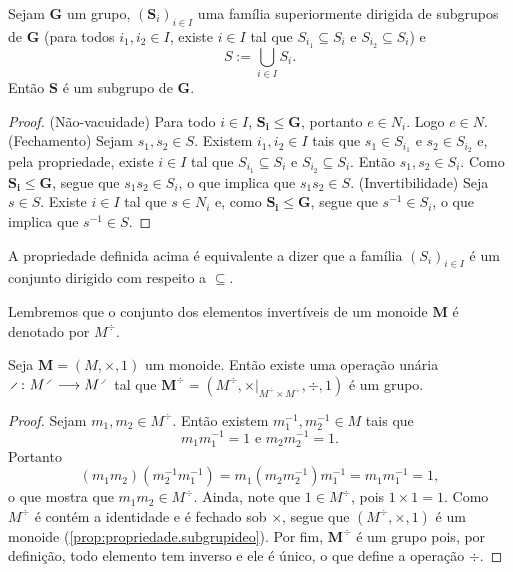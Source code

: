 \begin{proposition}
\label{alge:prop.subgru.uni}
Sejam $\bm G$ um grupo, $(\bm S_i)_{i \in I}$ uma família superiormente dirigida de subgrupos de $\bm G$ (para todos $i_1,i_2 \in I$, existe $i \in I$ tal que $S_{i_1} \subseteq S_i$ e $S_{i_2} \subseteq S_i$) e
	\begin{equation*}
	S := \bigcup_{i \in I} S_i.
	\end{equation*}
Então $\bm S$ é um subgrupo de $\bm G$.
\end{proposition}
\begin{proof}
(Não-vacuidade) Para todo $i \in I$, $\bm{S_i}\leq \bm G$, portanto $e \in N_i$. Logo $e \in N$. (Fechamento) Sejam $s_1,s_2 \in S$. Existem $i_1,i_2 \in I$ tais que $s_1 \in S_{i_1}$ e $s_2 \in S_{i_2}$ e, pela propriedade, existe $i \in I$ tal que $S_{i_1} \subseteq S_{i} \text{\ \ e\ \ } S_{i_2} \subseteq S_{i}$. Então $s_1,s_2 \in S_i$. Como $\bm{S_i} \leq \bm G$, segue que $s_1s_2 \in S_i$, o que implica que $s_1s_2 \in S$. (Invertibilidade) Seja $s \in S$. Existe $i \in I$ tal que $s \in N_i$ e, como $\bm{S_i} \leq \bm G$, segue que $s^{-1} \in S_i$, o que implica que $s^{-1} \in S$.
\end{proof}

A propriedade definida acima é equivalente a dizer que a família $(S_i)_{i \in I}$ é um conjunto dirigido com respeito a $\subseteq$.

Lembremos que o conjunto dos elementos invertíveis de um monoide $\bm M$ é denotado por $M^{\div}$.


\begin{proposition}
Seja $\bm M = (M,\times,1)$ um monoide. Então existe uma operação unária $\fun{\div}{M^{\div}}{M^{\div}}$ tal que $\bm{M^{\div}}=(M^{\div},\times|_{M^{\div} \times M^{\div}},\div,1)$ é um grupo.
\end{proposition}
\begin{proof}
	Sejam $m_1,m_2 \in M^{\div}$. Então existem $m_1^{-1},m_2^{-1} \in M$ tais que
	\begin{equation*}
	m_1m_1^{-1}=1 \text{\ \ e\ \ } m_2m_2^{-1}=1.
	\end{equation*}
Portanto
	\begin{equation*}
	(m_1m_2)(m_2^{-1}m_1^{-1}) = m_1(m_2m_2^{-1})m_1^{-1} = m_1m_1^{-1} = 1,
	\end{equation*}
o que mostra que $m_1m_2 \in M^{\div}$. Ainda, note que $1 \in M^{\div}$, pois $1 \times 1 = 1$. Como $M^{\div}$ é contém a identidade e é fechado sob $\times$, segue que $(M^{\div},\times,1)$ é um monoide (\ref{prop:propriedade.subgrupideo}). Por fim, $\bm{M^{\div}}$ é um grupo pois, por definição, todo elemento tem inverso e ele é único, o que define a operação $\div$.
\end{proof}

